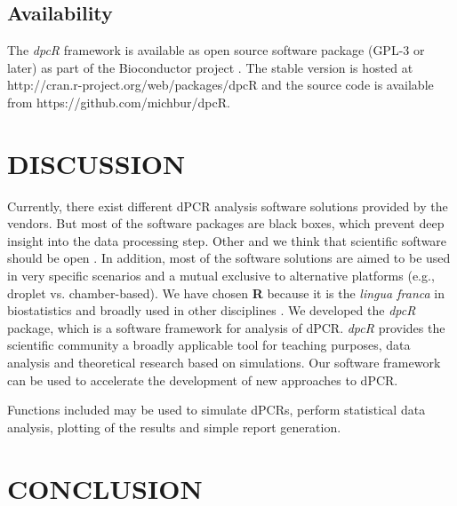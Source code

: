 \documentclass[a4,center,fleqn]{NAR}
\begin{document}
\subsection{Availability}

The \textit{dpcR} framework is available as open source software package (GPL-3 
or later) as part of the Bioconductor project \cite{gentleman_2004}. The stable 
version is hosted at http://cran.r-project.org/web/packages/dpcR and the source 
code is available from  https://github.com/michbur/dpcR.

\section{DISCUSSION}

Currently, there exist different dPCR analysis software solutions provided by 
the vendors. But most of the software packages are black boxes, which 
prevent deep insight into the data processing step. Other and we think that 
scientific software should be open \cite{ince_case_2012, 
rodiger_r_2015}. In addition, most of the software solutions are aimed to be 
used in very specific scenarios and a mutual exclusive to alternative platforms 
(e.g., droplet vs. chamber-based). We have chosen \textbf{R} because it is the 
\textit{lingua franca} in biostatistics and broadly used in other disciplines 
\cite{rodiger_r_2015}. We developed the \textit{dpcR} package, which is a 
software framework for analysis of dPCR. \textit{dpcR} provides the scientific 
community a broadly applicable tool for teaching purposes, data analysis and 
theoretical research based on simulations. Our software framework can be used 
to 
accelerate the development of new approaches to dPCR.

Functions included may be used to simulate dPCRs, perform statistical data 
analysis, plotting of the results and simple report generation. 

\section{CONCLUSION}
\end{document}
